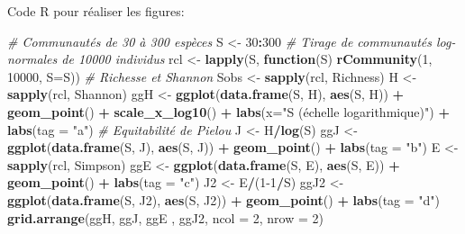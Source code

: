 \documentclass[
  11pt,
  french,
  a4paper,
  extrafontsizes,onecolumn,openright
  ]{memoir}
\newenvironment{Shaded}{\begin{snugshade}}{\end{snugshade}}
\newcommand{\CommentTok}[1]{\textcolor[rgb]{0.56,0.35,0.01}{\textit{#1}}}
\newcommand{\ControlFlowTok}[1]{\textcolor[rgb]{0.13,0.29,0.53}{\textbf{#1}}}
\newcommand{\DataTypeTok}[1]{\textcolor[rgb]{0.13,0.29,0.53}{#1}}
\newcommand{\DecValTok}[1]{\textcolor[rgb]{0.00,0.00,0.81}{#1}}
\newcommand{\KeywordTok}[1]{\textcolor[rgb]{0.13,0.29,0.53}{\textbf{#1}}}
\newcommand{\NormalTok}[1]{#1}
\newcommand{\OperatorTok}[1]{\textcolor[rgb]{0.81,0.36,0.00}{\textbf{#1}}}
\newcommand{\StringTok}[1]{\textcolor[rgb]{0.31,0.60,0.02}{#1}}
\begin{document}
\normalsize

Code R pour réaliser les figures:

\scriptsize

\begin{Shaded}
\begin{Highlighting}[]
\CommentTok{# Communautés de 30 à 300 espèces}
\NormalTok{S <-}\StringTok{ }\DecValTok{30}\OperatorTok{:}\DecValTok{300}
\CommentTok{# Tirage de communautés log-normales de 10000 individus}
\NormalTok{rcl <-}\StringTok{ }\KeywordTok{lapply}\NormalTok{(S, }\ControlFlowTok{function}\NormalTok{(S) }\KeywordTok{rCommunity}\NormalTok{(}\DecValTok{1}\NormalTok{, }\DecValTok{10000}\NormalTok{, }\DataTypeTok{S=}\NormalTok{S))}
\CommentTok{# Richesse et Shannon}
\NormalTok{Sobs <-}\StringTok{ }\KeywordTok{sapply}\NormalTok{(rcl, Richness)}
\NormalTok{H <-}\StringTok{ }\KeywordTok{sapply}\NormalTok{(rcl, Shannon)}
\NormalTok{ggH <-}\StringTok{ }\KeywordTok{ggplot}\NormalTok{(}\KeywordTok{data.frame}\NormalTok{(S, H), }\KeywordTok{aes}\NormalTok{(S, H)) }\OperatorTok{+}
\StringTok{  }\KeywordTok{geom_point}\NormalTok{() }\OperatorTok{+}\StringTok{ }\KeywordTok{scale_x_log10}\NormalTok{() }\OperatorTok{+}\StringTok{ }
\StringTok{  }\KeywordTok{labs}\NormalTok{(}\DataTypeTok{x=}\StringTok{"S (échelle logarithmique)"}\NormalTok{) }\OperatorTok{+}
\StringTok{  }\KeywordTok{labs}\NormalTok{(}\DataTypeTok{tag =} \StringTok{"a"}\NormalTok{)}
\CommentTok{# Equitabilité de Pielou}
\NormalTok{J <-}\StringTok{ }\NormalTok{H}\OperatorTok{/}\KeywordTok{log}\NormalTok{(S)}
\NormalTok{ggJ <-}\StringTok{ }\KeywordTok{ggplot}\NormalTok{(}\KeywordTok{data.frame}\NormalTok{(S, J), }\KeywordTok{aes}\NormalTok{(S, J)) }\OperatorTok{+}
\StringTok{  }\KeywordTok{geom_point}\NormalTok{() }\OperatorTok{+}\StringTok{ }\KeywordTok{labs}\NormalTok{(}\DataTypeTok{tag =} \StringTok{"b"}\NormalTok{)}
\NormalTok{E <-}\StringTok{ }\KeywordTok{sapply}\NormalTok{(rcl, Simpson)}
\NormalTok{ggE <-}\StringTok{ }\KeywordTok{ggplot}\NormalTok{(}\KeywordTok{data.frame}\NormalTok{(S, E), }\KeywordTok{aes}\NormalTok{(S, E)) }\OperatorTok{+}
\StringTok{  }\KeywordTok{geom_point}\NormalTok{() }\OperatorTok{+}\StringTok{ }\KeywordTok{labs}\NormalTok{(}\DataTypeTok{tag =} \StringTok{"c"}\NormalTok{)}
\NormalTok{J2 <-}\StringTok{ }\NormalTok{E}\OperatorTok{/}\NormalTok{(}\DecValTok{1-1}\OperatorTok{/}\NormalTok{S)}
\NormalTok{ggJ2 <-}\StringTok{ }\KeywordTok{ggplot}\NormalTok{(}\KeywordTok{data.frame}\NormalTok{(S, J2), }\KeywordTok{aes}\NormalTok{(S, J2)) }\OperatorTok{+}
\StringTok{  }\KeywordTok{geom_point}\NormalTok{() }\OperatorTok{+}\StringTok{ }\KeywordTok{labs}\NormalTok{(}\DataTypeTok{tag =} \StringTok{"d"}\NormalTok{)}
\KeywordTok{grid.arrange}\NormalTok{(ggH, ggJ, ggE , ggJ2, }\DataTypeTok{ncol =} \DecValTok{2}\NormalTok{, }\DataTypeTok{nrow =} \DecValTok{2}\NormalTok{)}
\end{Highlighting}
\end{Shaded}
\end{document}
